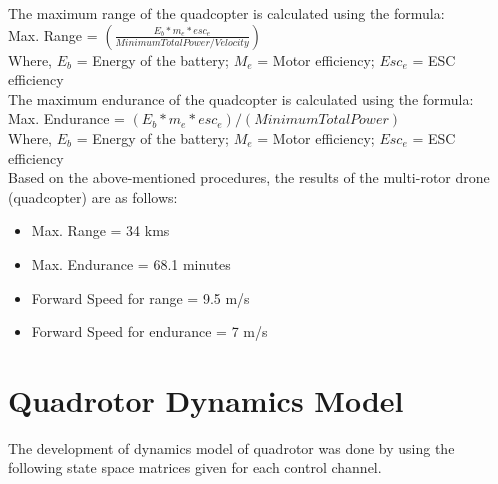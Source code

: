 The maximum range of the quadcopter is calculated using the formula: \\

Max. Range = $ (\frac{E_b * m_e * esc_e }{Minimum Total Power/Velocity}) $ \\

Where, $ E_b $  = Energy of the battery;  $ M_e $ = Motor efficiency;  $ Esc_e $ = ESC efficiency \\

The maximum endurance of the quadcopter is calculated using the formula: \\

Max. Endurance = $ (E_b * m_e * esc_e) / (Minimum Total Power) $ \\
Where, $ E_b $ = Energy of the battery; $ M_e $ = Motor efficiency; $ Esc_e $ = ESC efficiency \\

Based on the above-mentioned procedures, the results of the multi-rotor drone (quadcopter) are as follows: \\
\begin{itemize}
	\item Max. Range = 34 kms
	\item Max. Endurance = 68.1 minutes
	\item Forward Speed for range = 9.5 m/s
	\item Forward Speed for endurance = 7 m/s
\end{itemize}

\section{Quadrotor Dynamics Model}

The development of dynamics model of quadrotor was done by using the following state space matrices given for each control channel.

